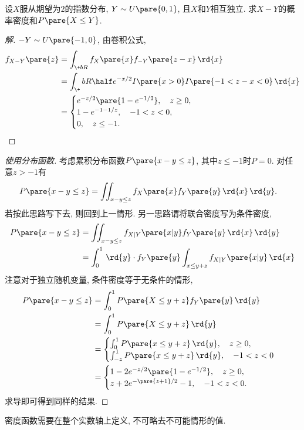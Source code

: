 \documentclass[../Statistics.tex]{subfiles}
\begin{document}
\begin{sample}
    \begin{ex}
        设$X$服从期望为$2$的指数分布, $Y\sim U\pare{0,1}$, 且$X$和$Y$相互独立. 求$X-Y$的概率密度和$P\pare{X\le Y}$.
    \end{ex}
    \begin{proof}[解]
        $-Y\sim U\pare{-1,0}$, 由卷积公式,
        \begin{align*}
            f_{X-Y}\pare{z} &= \int_{\+bR} f_X\pare{x} f_{-Y}\pare{z-x}\,\rd{x}\\
            & = \int_\+bR \half e^{-x/2}I\pare{x>0}I\pare{-1<z-x<0}\,\rd{x}\\
            &= \begin{cases}
                e^{-z/2}\pare{1-e^{-1/2}},\quad z\ge 0,\\
                1-e^{-1-1/z},\quad -1<z<0,\\
                0,\quad z\le -1.
            \end{cases}
            \qedhere
        \end{align*}
    \end{proof}
    \begin{proof}[使用分布函数]
        考虑累积分布函数$P\pare{x-y\le z}$, 其中$z\le -1$时$P = 0$. 对任意$z > -1$有
        \begin{align*}
            P\pare{x-y\le z} &= \iint_{x-y\le z} f_X\pare{x} f_Y\pare{y}\,\rd{x}\,\rd{y}.
        \end{align*}
        若按此思路写下去, 则回到上一情形. 另一思路谓将联合密度写为条件密度, 
        \begin{align*}
            P\pare{x-y\le z} &= \iint_{x-y\le z} f_{X\vert Y}\pare{x\vert y} f_Y\pare{y}\,\rd{x}\,\rd{y} \\
            &= \int_{0}^1 \,\rd{y}\cdot f_Y\pare{y} \int_{x\le y+z} f_{X\vert Y}\pare{x\vert y}\,\rd{x}
        \end{align*}
        注意对于独立随机变量, 条件密度等于无条件的情形,
        \begin{align*}
            P\pare{x-y\le z} &= \int_0^1 P\pare{X\le y+z}f_Y\pare{y}\,\rd{y} \\
            &= \int_0^1 P\pare{X\le y+z}\,\rd{y} \\
            &= \begin{cases}
                \int_0^1 P\pare{x\le y+z}\,\rd{y},\quad z\ge 0,\\
                \int_{-z}^1 P\pare{x\le y+z}\,\rd{y},\quad -1 < z < 0
            \end{cases}\\
            &= \begin{cases}
                1 - 2e^{-z/2}\pare{1-e^{-1/2}},\quad z\ge 0,\\
                z + 2e^{-\pare{z+1}/2} -1,\quad -1<z<0.
            \end{cases}
        \end{align*}
        求导即可得到同样的结果.
    \end{proof}
\end{sample}
\begin{remark}
    密度函数需要在整个实数轴上定义, 不可略去不可能情形的值.
\end{remark}
\end{document}
